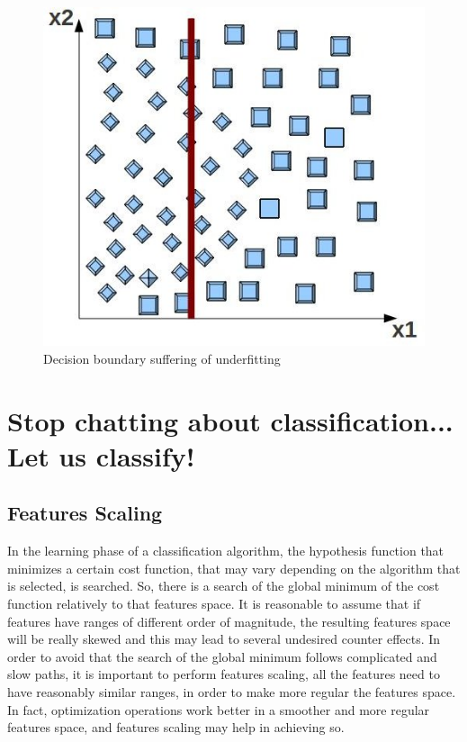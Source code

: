 \documentclass[aps,letterpaper,10pt]{revtex4}
\begin{document}
\begin{figure}[]
%
  \includegraphics[width=\linewidth]{img/template_quadratic_region_underfitting.jpg}
  \caption{Decision boundary suffering of underfitting}\label{fig:3}
\endminipage
\end{figure}

\section{Stop chatting about classification... Let us classify!}
\subsection{Features Scaling}
In the learning phase of a classification algorithm, the hypothesis function that minimizes a certain cost function, that may vary depending on the algorithm that is selected, is searched. So, there is a search of the global minimum of the cost function relatively to that features space.  It is reasonable to assume that if features have ranges of different order of magnitude, the resulting features space will be really skewed and this may lead to several undesired counter effects. In order to avoid that the search of the global minimum follows complicated and slow paths, it is important to perform features scaling, all the features need to have reasonably similar ranges, in order to make more regular the features space. In fact, optimization operations work better in a smoother and more regular features space, and features scaling may help in achieving so.
\end{document}
